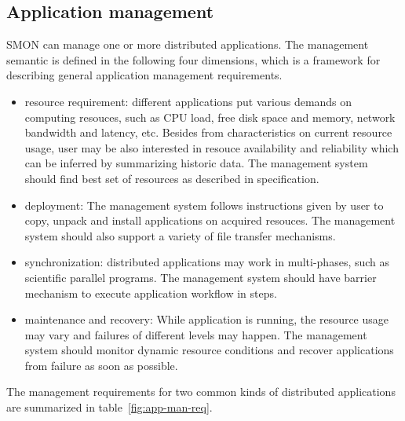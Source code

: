\subsection{Application management}

SMON can manage one or more distributed applications. The
management semantic is defined in the following four
dimensions, which is a framework for describing general
application management requirements.

\begin{itemize}

  \item resource requirement: different applications put
  various demands on computing resouces, such as CPU load,
  free disk space and memory, network bandwidth and latency,
  etc. Besides from characteristics on current resource
  usage, user may be also interested in resouce availability
  and reliability which can be inferred by summarizing
  historic data. The management system should find best set
  of resources as described in specification.

  \item deployment: The management system follows
  instructions given by user to copy, unpack and install
  applications on acquired resouces. The management system
  should also support a variety of file transfer mechanisms.

  \item synchronization: distributed applications may work
  in multi-phases, such as scientific parallel programs.
  The management system should have barrier mechanism to
  execute application workflow in steps.

  \item maintenance and recovery: While application is running,
  the resource usage may vary and failures of different
  levels may happen. The management system should monitor
  dynamic resource conditions and recover applications from
  failure as soon as possible.

\end{itemize}

The management requirements for two common kinds of
distributed applications are summarized in
table~\ref{fig:app-man-req}.


